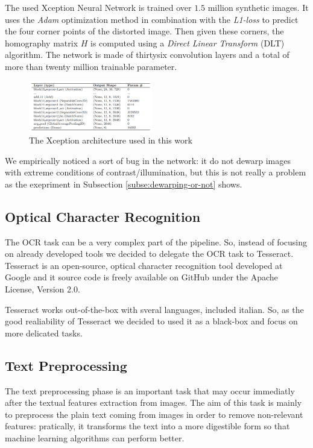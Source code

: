 \documentclass[10pt,twocolumn,letterpaper]{article}
\begin{document}
The used Xception Neural Network is trained over $1.5$ million
synthetic images. It uses the \emph{Adam} optimization method in
combination with the \emph{L1-loss} to predict the four corner points
of the distorted image. Then given these corners, the homography
matrix $H$ is computed using a \emph{Direct Linear Transform} (DLT)
algorithm. The network is made of thirtysix convolution layers and a
total of more than twenty million trainable parameter.

\begin{figure}[!ht]
  \centering
  \includegraphics[width=0.48\textwidth]{images/xception-architecture.png}
  \caption{The Xception architecture used in this work}
  \label{fig:xception-architecture}
\end{figure}

We empirically noticed a sort of bug in the network: it do not dewarp
images with extreme conditions of contrast/illumination, but this is
not really a problem as the exepriment in Subsection
\ref{subse:dewarping-or-not} shows.

\subsection{Optical Character Recognition}

The OCR task can be a very complex part of the pipeline. So, instead
of focusing on already developed tools we decided to delegate the OCR
task to Tesseract. Tesseract is an open-source, optical character
recognition tool developed at Google and it source code is freely
available on GitHub under the Apache License, Version 2.0.

Tesseract works out-of-the-box with sveral languages, included
italian. So, as the good realiability of Tesseract we decided to used
it as a black-box and focus on more delicated tasks.

\subsection{Text Preprocessing}

The text preprocessing phase is an important task that may occur
immediatly after the textual features extraction from images. The aim
of this task is mainly to preprocess the plain text coming from images
in order to remove non-relevant features: pratically, it transforms the
text into a more digestible form so that machine learning algorithms
can perform better.
\end{document}
